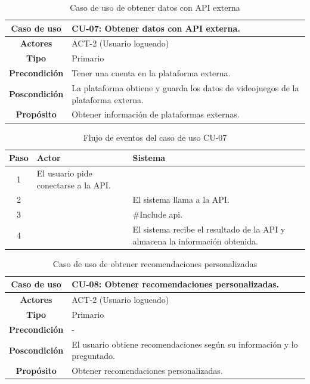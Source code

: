 \begin{table}[H]
\centering
\begin{tabular}{|c|p{10cm}|}
\hline
\rowcolor{green!40} \textbf{Caso de uso} & CU-07: Obtener datos con API externa. \\ \hline
\rowcolor{blue!10} \textbf{Actores} & ACT-2 (Usuario logueado) \\ \hline
\rowcolor{blue!10} \textbf{Tipo} & Primario \\ \hline
\rowcolor{blue!10} \textbf{Precondición} & Tener una cuenta en la plataforma externa. \\ \hline
\rowcolor{blue!10} \textbf{Poscondición} & La plataforma obtiene y guarda los datos de videojuegos de la plataforma externa. \\ \hline
\rowcolor{blue!10} \textbf{Propósito} & Obtener información de plataformas externas. \\ \hline
\end{tabular}
\caption{Caso de uso de obtener datos con API externa}
\end{table}

\begin{table}[H]
\centering
\begin{tabular}{|c|p{5cm}|p{5cm}|}
\hline
\rowcolor{green!40} \textbf{Paso} & \textbf{Actor} & \textbf{Sistema} \\ \hline
\rowcolor{blue!10} 1 & El usuario pide conectarse a la API. &  \\ \hline
\rowcolor{blue!10} 2 &  & El sistema llama a la API. \\ \hline
\rowcolor{blue!10} 3 &  & \#Include api. \\ \hline
\rowcolor{blue!10} 4 &  & El sistema recibe el resultado de la API y almacena la información obtenida. \\ \hline
\end{tabular}
\caption{Flujo de eventos del caso de uso CU-07}
\end{table}

\begin{table}[H]
\centering
\begin{tabular}{|c|p{10cm}|}
\hline
\rowcolor{green!40} \textbf{Caso de uso} & CU-08: Obtener recomendaciones personalizadas. \\ \hline
\rowcolor{blue!10} \textbf{Actores} & ACT-2 (Usuario logueado) \\ \hline
\rowcolor{blue!10} \textbf{Tipo} & Primario \\ \hline
\rowcolor{blue!10} \textbf{Precondición} & - \\ \hline
\rowcolor{blue!10} \textbf{Poscondición} & El usuario obtiene recomendaciones según su información y lo preguntado. \\ \hline
\rowcolor{blue!10} \textbf{Propósito} & Obtener recomendaciones personalizadas. \\ \hline
\end{tabular}
\caption{Caso de uso de obtener recomendaciones personalizadas}
\end{table}


